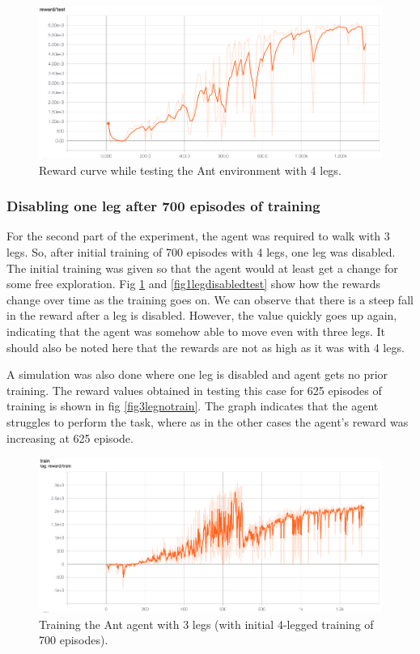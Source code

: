 \documentclass[conference]{IEEEtran}
\begin{document}
\begin{figure}[htbp]
\centerline{\includegraphics[width=\linewidth]{img/ant4-reward-test.png}}
\caption{Reward curve while testing the Ant environment with 4 legs.}
\label{fig4legtest}
\end{figure}

\subsubsection{Disabling one leg after 700 episodes of training}
For the second part of the experiment, the agent was required to walk with 3 legs. So, after initial training of 700 episodes with 4 legs, one leg was disabled. The initial training was given so that the agent would at least get a change for some free exploration.
Fig \ref{fig4legtest} and \ref{fig1legdisabledtest} show how the rewards change over time as the training goes on. We can observe that there is a steep fall in the reward after a leg is disabled. However, the value quickly goes up again, indicating that the agent was somehow able to move even with three legs. It should also be noted here that the rewards are not as high as it was with 4 legs. 

A simulation was also done where one leg is disabled and agent gets no prior training. The reward values obtained in testing this case for 625 episodes of training is shown in fig \ref{fig3legnotrain}. The graph indicates that the agent struggles to perform the task, where as in the other cases the agent's reward was increasing at 625 episode. 

\begin{figure}[htbp]
\centerline{\includegraphics[width=\linewidth]{img/ant-1-disabled-reward_train.png}}
\caption{Training the Ant agent with 3 legs (with initial 4-legged training of 700 episodes).}
\label{fig1legdisabledtrain}
\end{figure}
\end{document}
